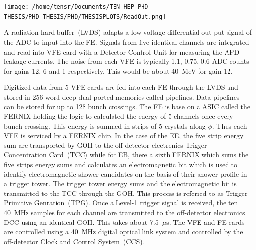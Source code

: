 \begin{center}\label{readout}
\centering
\mbox{\texttt{[image: /home/tensr/Documents/TEN-HEP-PHD-THESIS/PHD\_THESIS/PHD/THESISPLOTS/ReadOut.png]}} 
\label{fig:readout}
\end{center}

A radiation-hard buffer~(LVDS) adapts a low voltage differential out put signal of the ADC to input into the FE. Signals from  five  identical channels are integrated and read into VFE card with a Detector Control Unit for measuring  the APD leakage currents. The noise from each VFE is typically 1.1, 0.75, 0.6 ADC counts for gains 12, 6 and 1 respectively. This would be about 40~MeV for gain 12.

Digitized data from 5 VFE cards are fed into each FE through the LVDS and stored in 256-word-deep dual-ported memories called pipelines. Data pipelines can be stored for up to 128 bunch crossings. The FE is base on a ASIC called the FERNIX holding the logic to calculated the energy of 5 channels once every bunch crossing. This energy is summed in strips of 5 crystals  along $\phi$. Thus each VFE is serviced by a FERNIX chip. In the case of the EE, the five strip energy sum are transported by GOH to the off-detector electronics Trigger Concentration Card~(TCC) while for EB, there a sixth FERNIX which sums the five strips energy sums  and calculates an electromagnetic bit which is used to identify electromagnetic shower candidates on the basis of their shower profile in a trigger tower. The trigger tower energy sums and the electromagnetic bit is transmitted to the TCC through the GOH. This process is referred to as Trigger Primitive Genration~(TPG). Once a Level-1 trigger signal is received, the ten 40~MHz samples for each channel are transmitted to the off-detector electronics DCC using an identical GOH. This takes about 7.5~$\mu$s. The VFE and FE cards are controlled using a 40~MHz digital optical link system and controlled by the off-detector Clock and Control System~(CCS). 
